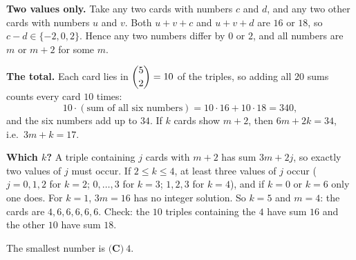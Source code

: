 \textbf{Two values only.} Take any two cards with numbers $c$ and $d$, and any two other cards with numbers $u$ and $v$. Both $u+v+c$ and $u+v+d$ are $16$ or $18$, so $c-d\in\{-2,0,2\}$. Hence any two numbers differ by $0$ or $2$, and all numbers are $m$ or $m+2$ for some $m$.

\textbf{The total.} Each card lies in $\dbinom52=10$ of the triples, so adding all $20$ sums counts every card $10$ times:
\[
10\cdot(\text{sum of all six numbers})=10\cdot16+10\cdot18=340,
\]
and the six numbers add up to $34$. If $k$ cards show $m+2$, then $6m+2k=34$, i.e.\ $3m+k=17$.

\textbf{Which $k$?} A triple containing $j$ cards with $m+2$ has sum $3m+2j$, so exactly two values of $j$ must occur. If $2\le k\le4$, at least three values of $j$ occur ($j=0,1,2$ for $k=2$; $0,\dots,3$ for $k=3$; $1,2,3$ for $k=4$), and if $k=0$ or $k=6$ only one does. For $k=1$, $3m=16$ has no integer solution. So $k=5$ and $m=4$: the cards are $4,6,6,6,6,6$. Check: the $10$ triples containing the $4$ have sum $16$ and the other $10$ have sum $18$.

The smallest number is $\boxed{\textbf{(C)}\ 4}$.

